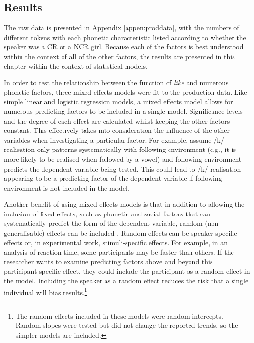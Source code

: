 \subsection{Results}\label{sec:prodresults}

The raw data is presented in Appendix \ref{appen:proddata}, with the numbers of different tokens with each phonetic characteristic listed according to whether the speaker was a CR or a NCR girl. Because each of the factors is best understood within the context of all of the other factors, the results are presented in this chapter within the context of statistical models.

In order to test the relationship between the function of \textit{like} and numerous phonetic factors, three mixed effects models were fit to the production data. Like simple linear and logistic regression models, a mixed effects model allows for numerous predicting factors to be included in a single model. Significance levels and the degree of each effect are calculated whilst keeping the other factors constant. This effectively takes into consideration the influence of the other variables when investigating a particular factor. For example, assume /k/ realisation only patterns systematically with following environment (e.g., it is more likely to be realised when followed by a vowel) and following environment predicts the dependent variable being tested. This could lead to /k/ realisation appearing to be a predicting factor of the dependent variable if following environment is not included in the model. 

Another benefit of using mixed effects models is that in addition to allowing the inclusion of fixed effects, such as phonetic and social factors that can systematically predict the form of the dependent variable, random (non-generalisable) effects can be included \citep[263-326]{baayen2008}.  Random effects can be speaker-specific effects or, in experimental work, stimuli-specific effects. For example, in an analysis of reaction time, some participants may be faster than others. If the researcher wants to examine predicting factors above and beyond this participant-specific effect, they could include the participant as a random effect in the model. Including the speaker as a random effect reduces the risk that a single individual will bias results.\footnote{The random effects included in these models were random intercepts. Random slopes were tested but did not change the reported trends, so the simpler models are included.} 

